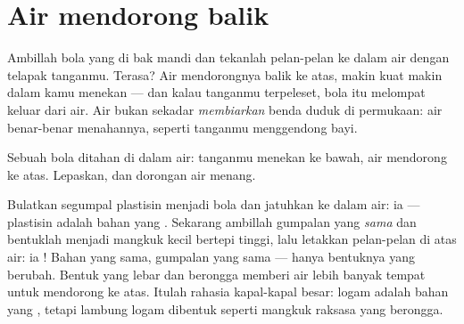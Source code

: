 \section{Air mendorong balik}

\begin{example}\label{ex:g1:floating-and-sinking:push}
Ambillah bola yang  di bak mandi dan tekanlah pelan-pelan ke
dalam air dengan telapak tanganmu. Terasa? Air mendorongnya balik ke
atas, makin kuat makin dalam kamu menekan --- dan kalau tanganmu
terpeleset, bola itu melompat keluar dari air. Air bukan sekadar
\emph{membiarkan} benda  duduk di permukaan: air benar-benar
menahannya, seperti tanganmu menggendong bayi.
\end{example}

\begin{omfigure}

{\small Sebuah bola ditahan di dalam air: tanganmu menekan ke bawah,
air mendorong ke atas. Lepaskan, dan dorongan air menang.}
\end{omfigure}

\begin{example}\label{ex:g1:floating-and-sinking:boat}
Bulatkan segumpal plastisin menjadi bola dan jatuhkan ke dalam air: ia
 --- plastisin adalah bahan yang . Sekarang ambillah
gumpalan yang \emph{sama} dan bentuklah menjadi mangkuk kecil bertepi
tinggi, lalu letakkan pelan-pelan di atas air: ia ! Bahan yang
sama, gumpalan yang sama --- hanya bentuknya yang berubah. Bentuk yang
lebar dan berongga memberi air lebih banyak tempat untuk mendorong ke
atas. Itulah rahasia kapal-kapal besar: logam adalah bahan yang
, tetapi lambung logam dibentuk seperti mangkuk raksasa yang
berongga.
\end{example}

